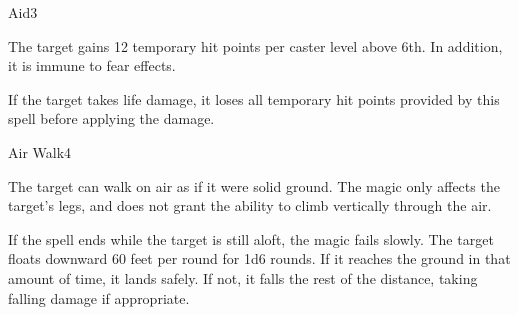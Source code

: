 \begin{spellsection}{Aid}{3}
\begin{spellheader}
\end{spellheader}
\begin{spellcontent}
    \begin{spelltargetinginfo}
    \end{spelltargetinginfo}
    \begin{spelleffects}
        \spelleffect The target gains 12 temporary hit points  per caster level above 6th. In addition, it is immune to fear effects.
        \spelldur \durpersonallong
    \end{spelleffects}
\end{spellcontent}
\begin{spellfooter}
    \spellnotes If the target takes life damage, it loses all temporary hit points provided by this spell before applying the damage.
\end{spellfooter}
\end{spellsection}

\begin{spellsection}{Air Walk}{4}
\begin{spellheader}
\end{spellheader}
\begin{spellcontent}
    \begin{spelltargetinginfo}
    \end{spelltargetinginfo}
    \begin{spelleffects}
        \spelleffect The target can walk on air as if it were solid ground. The magic only affects the target's legs, and does not grant the ability to climb vertically through the air.
        \par If the spell ends while the target is still aloft, the magic fails slowly. The target floats downward 60 feet per round for 1d6 rounds. If it reaches the ground in that amount of time, it lands safely. If not, it falls the rest of the distance, taking falling damage if appropriate.
        \spelldur \durshort
    \end{spelleffects}
\end{spellcontent}
\begin{spellfooter}
\end{spellfooter}
\end{spellsection}


